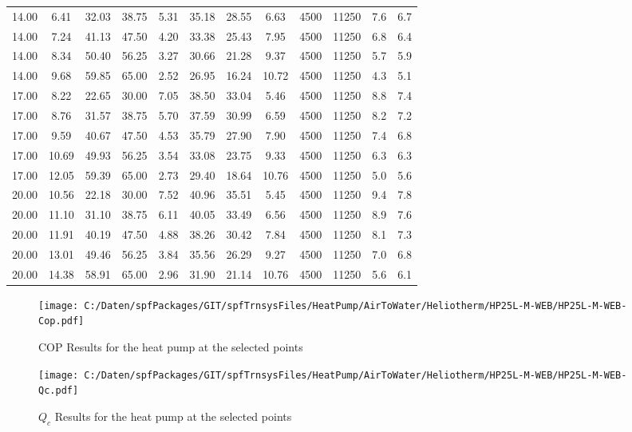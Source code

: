 \documentclass[english]{SPFShortReport}
\begin{document}
\begin{table}[!ht]
\begin{small}
\begin{center}
{\begin{tabular}{l | c c c c c c c c c c c }
14.00 & 6.41 & 32.03 & 38.75 & 5.31 & 35.18 & 28.55 & 6.63 & 4500 & 11250 & 7.6 & 6.7\\ 
14.00 & 7.24 & 41.13 & 47.50 & 4.20 & 33.38 & 25.43 & 7.95 & 4500 & 11250 & 6.8 & 6.4\\ 
14.00 & 8.34 & 50.40 & 56.25 & 3.27 & 30.66 & 21.28 & 9.37 & 4500 & 11250 & 5.7 & 5.9\\ 
14.00 & 9.68 & 59.85 & 65.00 & 2.52 & 26.95 & 16.24 & 10.72 & 4500 & 11250 & 4.3 & 5.1\\ 
17.00 & 8.22 & 22.65 & 30.00 & 7.05 & 38.50 & 33.04 & 5.46 & 4500 & 11250 & 8.8 & 7.4\\ 
17.00 & 8.76 & 31.57 & 38.75 & 5.70 & 37.59 & 30.99 & 6.59 & 4500 & 11250 & 8.2 & 7.2\\ 
17.00 & 9.59 & 40.67 & 47.50 & 4.53 & 35.79 & 27.90 & 7.90 & 4500 & 11250 & 7.4 & 6.8\\ 
17.00 & 10.69 & 49.93 & 56.25 & 3.54 & 33.08 & 23.75 & 9.33 & 4500 & 11250 & 6.3 & 6.3\\ 
17.00 & 12.05 & 59.39 & 65.00 & 2.73 & 29.40 & 18.64 & 10.76 & 4500 & 11250 & 5.0 & 5.6\\ 
20.00 & 10.56 & 22.18 & 30.00 & 7.52 & 40.96 & 35.51 & 5.45 & 4500 & 11250 & 9.4 & 7.8\\ 
20.00 & 11.10 & 31.10 & 38.75 & 6.11 & 40.05 & 33.49 & 6.56 & 4500 & 11250 & 8.9 & 7.6\\ 
20.00 & 11.91 & 40.19 & 47.50 & 4.88 & 38.26 & 30.42 & 7.84 & 4500 & 11250 & 8.1 & 7.3\\ 
20.00 & 13.01 & 49.46 & 56.25 & 3.84 & 35.56 & 26.29 & 9.27 & 4500 & 11250 & 7.0 & 6.8\\ 
20.00 & 14.38 & 58.91 & 65.00 & 2.96 & 31.90 & 21.14 & 10.76 & 4500 & 11250 & 5.6 & 6.1\\ 
\hline
\hline
\end{tabular}
}
\label{ResultsTable}
\end{center}
\end{small}
\end{table}
\begin{figure}[!ht]
\begin{center}
\texttt{[image: C:/Daten/spfPackages/GIT/spfTrnsysFiles/HeatPump/AirToWater/Heliotherm/HP25L-M-WEB/HP25L-M-WEB-Cop.pdf]}
\caption{COP Results for the heat pump at the selected points}
\label{COPFig}
\end{center}
\end{figure}
\begin{figure}[!ht]
\begin{center}
\texttt{[image: C:/Daten/spfPackages/GIT/spfTrnsysFiles/HeatPump/AirToWater/Heliotherm/HP25L-M-WEB/HP25L-M-WEB-Qc.pdf]}
\caption{$Q_c$ Results for the heat pump at the selected points}
\label{QcFig}
\end{center}
\end{figure}
\end{document}
